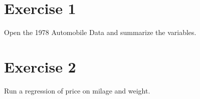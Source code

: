 \documentclass[a4paper]{article}
\begin{document}
\section*{Exercise 1}
Open the 1978 Automobile Data and summarize the variables.

\begin{stlog}\end{stlog}

\section*{Exercise 2}
Run a regression of price on milage and weight.

\begin{stlog}\end{stlog}
\end{document}
